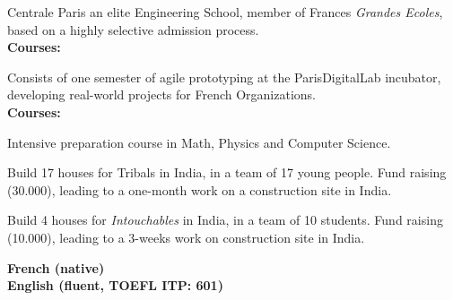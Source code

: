 



\small{Centrale Paris an elite Engineering School, member of France\textquotesingle s \emph{Grandes Ecoles}, based on a highly selective admission process.\\}
{\textbf{Courses:}} \footnotesize{    }

\divider

\small{Consists of one semester of agile prototyping at the ParisDigitalLab incubator, developing real-world projects for French Organizations.\\}%
{\textbf{Courses:}} \footnotesize{  }

\divider

\small{Intensive preparation course in Math, Physics and Computer Science.}

\divider





\small{Build 17 houses for Tribals in India, in a team of 17 young people.
Fund raising (30.000\texteuro), leading to a one-month work on a construction site in India.}

\divider


\small{Build 4 houses for \emph{Intouchables} in India, in a team of 10 students.
Fund raising (10.000\texteuro), leading to a 3-weeks work on construction site in India.}


{\textcolor{emphasis}{\textbf{French (native)\\English (fluent, TOEFL ITP: 601)}}}




